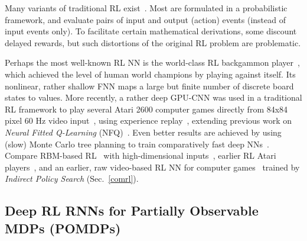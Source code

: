 \documentclass[letterpaper]{article}
\begin{document}
\begin{CJK*}{UTF8}{gbsn}
\begin{sloppypar}
Many variants of traditional RL exist~\citep[e.g.,][]{BartoSuttonAnderson:83,Watkins:89,WatkinsDayan:92,Moore:93,Schwartz:93,Rummery:94,Singh:94R,Baird:95,Kaelbling:95,Peng:96,Mahadevan:96,Tsitsiklis:96,96-BradtkeLstd,Santamaria:97,prwu97,Sutton:98,Wiering:98,baird:nips12,meuleau:icuai99,Doya:00,Bertsekas:01,brafman02,Abounadi:02,03-LspiLagoudakis,09-Gtd,10-GqLambda,hasselt2012}.
Most are formulated in a probabilistic framework,
and evaluate pairs of input and output (action) events (instead of input events only).
To facilitate certain mathematical derivations,
some discount delayed rewards,
but such distortions of the original RL problem are problematic.

Perhaps the most well-known RL NN is the  world-class RL backgammon player~\citep{Tesauro:94},
which achieved the level of human world champions by playing against itself.
Its nonlinear, rather shallow FNN maps a large but finite
number of discrete board states to values.   
More recently, a rather deep GPU-CNN  was used in
a traditional RL framework  to play several Atari 2600 computer games directly from 
84x84 pixel 60 Hz video input~\citep{atari2013},
using experience replay~\citep{Lin:93},
extending previous work on {\em Neural Fitted Q-Learning} (NFQ)~\citep{nfq}.
Even better results are achieved by using (slow) Monte Carlo tree planning to
train comparatively fast deep NNs~\citep{atarimcts2014}.
Compare RBM-based RL~\citep{sallans2004} with high-dimensional inputs~\citep{elfwing2010},
earlier RL Atari players~\citep{gruettner2010multi},
and an earlier, raw video-based RL NN for computer games~\citep{koutnik:gecco13} trained by {\em Indirect Policy Search}
(Sec.~\ref{comrl}). 


\subsection{Deep RL RNNs for Partially Observable MDPs (POMDPs)}
\label{pomrl}


\end{sloppypar}
\end{CJK*}
\end{document}
